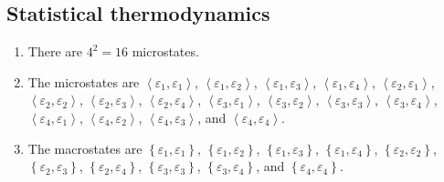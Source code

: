 \begin{@empty}
\section{Statistical thermodynamics}
\begin{problem}
\end{problem}

\begin{problem}
\end{problem}

\begin{problem}
\end{problem}

\begin{answer}
    \begin{enumerate}
        \item There are \( 4^2 = 16 \) microstates.
        \item The microstates are
            \( \left< \varepsilon_1, \varepsilon_1 \right> \),
            \( \left< \varepsilon_1, \varepsilon_2 \right> \),
            \( \left< \varepsilon_1, \varepsilon_3 \right> \),
            \( \left< \varepsilon_1, \varepsilon_4 \right> \),
            \( \left< \varepsilon_2, \varepsilon_1 \right> \),
            \( \left< \varepsilon_2, \varepsilon_2 \right> \),
            \( \left< \varepsilon_2, \varepsilon_3 \right> \),
            \( \left< \varepsilon_2, \varepsilon_4 \right> \),
            \( \left< \varepsilon_3, \varepsilon_1 \right> \),
            \( \left< \varepsilon_3, \varepsilon_2 \right> \),
            \( \left< \varepsilon_3, \varepsilon_3 \right> \),
            \( \left< \varepsilon_3, \varepsilon_4 \right> \),
            \( \left< \varepsilon_4, \varepsilon_1 \right> \),
            \( \left< \varepsilon_4, \varepsilon_2 \right> \),
            \( \left< \varepsilon_4, \varepsilon_3 \right> \),
            and \( \left< \varepsilon_4, \varepsilon_4 \right> \).
        \item The macrostates are
            \( \left\{ \varepsilon_1, \varepsilon_1 \right\} \),
            \( \left\{ \varepsilon_1, \varepsilon_2 \right\} \),
            \( \left\{ \varepsilon_1, \varepsilon_3 \right\} \),
            \( \left\{ \varepsilon_1, \varepsilon_4 \right\} \),
            \( \left\{ \varepsilon_2, \varepsilon_2 \right\} \),
            \( \left\{ \varepsilon_2, \varepsilon_3 \right\} \),
            \( \left\{ \varepsilon_2, \varepsilon_4 \right\} \),
            \( \left\{ \varepsilon_3, \varepsilon_3 \right\} \),
            \( \left\{ \varepsilon_3, \varepsilon_4 \right\} \),
            and \( \left\{ \varepsilon_4, \varepsilon_4 \right\} \).
    \end{enumerate}
\end{answer}


\end{@empty}
